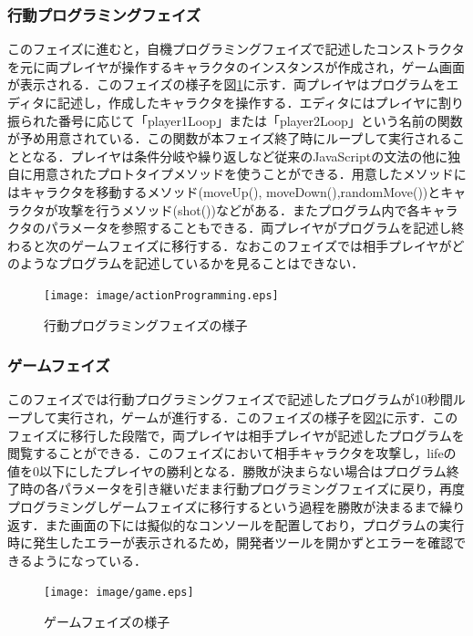 \subsubsection{行動プログラミングフェイズ}
このフェイズに進むと，自機プログラミングフェイズで記述したコンストラクタを元に両プレイヤが操作するキャラクタのインスタンスが作成され，ゲーム画面が表示される．このフェイズの様子を図\ref{actionProgramming}に示す．両プレイヤはプログラムをエディタに記述し，作成したキャラクタを操作する．エディタにはプレイヤに割り振られた番号に応じて「player1Loop」または「player2Loop」という名前の関数が予め用意されている．この関数が本フェイズ終了時にループして実行されることとなる．プレイヤは条件分岐や繰り返しなど従来のJavaScriptの文法の他に独自に用意されたプロトタイプメソッドを使うことができる．用意したメソッドにはキャラクタを移動するメソッド(moveUp(), moveDown(),randomMove())とキャラクタが攻撃を行うメソッド(shot())などがある．またプログラム内で各キャラクタのパラメータを参照することもできる．両プレイヤがプログラムを記述し終わると次のゲームフェイズに移行する．なおこのフェイズでは相手プレイヤがどのようなプログラムを記述しているかを見ることはできない．

\begin{figure}[!ht]
  \begin{center}
    \texttt{[image: image/actionProgramming.eps]}
  \end{center}
    \vspace{-8mm} 
  \caption{行動プログラミングフェイズの様子}
  \label{actionProgramming}
\end{figure}

\subsubsection{ゲームフェイズ}
このフェイズでは行動プログラミングフェイズで記述したプログラムが10秒間ループして実行され，ゲームが進行する．このフェイズの様子を図\ref{game}に示す．このフェイズに移行した段階で，両プレイヤは相手プレイヤが記述したプログラムを閲覧することができる．このフェイズにおいて相手キャラクタを攻撃し，lifeの値を0以下にしたプレイヤの勝利となる．勝敗が決まらない場合はプログラム終了時の各パラメータを引き継いだまま行動プログラミングフェイズに戻り，再度プログラミングしゲームフェイズに移行するという過程を勝敗が決まるまで繰り返す．また画面の下には擬似的なコンソールを配置しており，プログラムの実行時に発生したエラーが表示されるため，開発者ツールを開かずとエラーを確認できるようになっている．

\begin{figure}[!ht]
  \begin{center}
    \texttt{[image: image/game.eps]}
  \end{center}
    \vspace{-8mm} 
  \caption{ゲームフェイズの様子}
  \label{game}
\end{figure}

